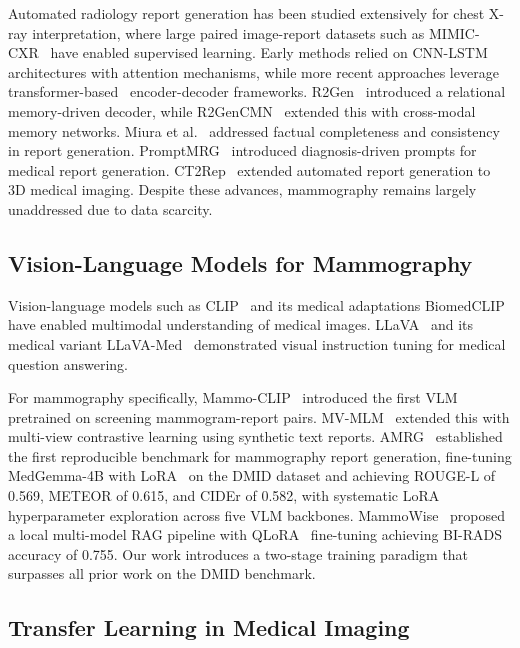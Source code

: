 \documentclass{wlscirep}
\begin{document}
Automated radiology report generation has been studied extensively for chest X-ray interpretation, where large paired image-report datasets such as MIMIC-CXR~\cite{johnson2019mimiccxr} have enabled supervised learning. Early methods relied on CNN-LSTM architectures with attention mechanisms, while more recent approaches leverage transformer-based~\cite{vaswani2017attention} encoder-decoder frameworks. R2Gen~\cite{chen2020r2gen} introduced a relational memory-driven decoder, while R2GenCMN~\cite{chen2022r2gencmn} extended this with cross-modal memory networks. Miura et al.~\cite{miura2021improving} addressed factual completeness and consistency in report generation. PromptMRG~\cite{jin2024promptmrg} introduced diagnosis-driven prompts for medical report generation. CT2Rep~\cite{hamamci2024ct2rep} extended automated report generation to 3D medical imaging. Despite these advances, mammography remains largely unaddressed due to data scarcity.

\subsection*{Vision-Language Models for Mammography}

Vision-language models such as CLIP~\cite{radford2021clip} and its medical adaptations BiomedCLIP~\cite{zhang2023biomedclip} have enabled multimodal understanding of medical images. LLaVA~\cite{liu2024llava} and its medical variant LLaVA-Med~\cite{li2024llavamed} demonstrated visual instruction tuning for medical question answering.

For mammography specifically, Mammo-CLIP~\cite{ghosh2024} introduced the first VLM pretrained on screening mammogram-report pairs. MV-MLM~\cite{ahmed2025} extended this with multi-view contrastive learning using synthetic text reports. AMRG~\cite{sung2025} established the first reproducible benchmark for mammography report generation, fine-tuning MedGemma-4B with LoRA~\cite{hu2022lora} on the DMID dataset and achieving ROUGE-L of 0.569, METEOR of 0.615, and CIDEr of 0.582, with systematic LoRA hyperparameter exploration across five VLM backbones. MammoWise~\cite{jahangir2026} proposed a local multi-model RAG pipeline with QLoRA~\cite{dettmers2024qlora} fine-tuning achieving BI-RADS accuracy of 0.755. Our work introduces a two-stage training paradigm that surpasses all prior work on the DMID benchmark.

\subsection*{Transfer Learning in Medical Imaging}
\end{document}
